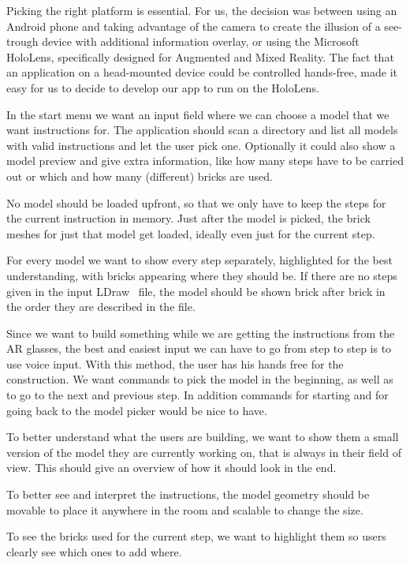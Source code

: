 \begin{description}[align=left]
	
	\item[Platform] 
	Picking the right platform is essential. For us, the decision was between using an Android phone and taking advantage of the camera to create the illusion of a see-trough device with additional information overlay, or using the Microsoft HoloLens, specifically designed for Augmented and Mixed Reality. The fact that an application on a head-mounted device could be controlled hands-free, made it easy for us to decide to develop our app to run on the HoloLens.
	
	\item [Model picker] 
	In the start menu we want an input field where we can choose a model that we want instructions for. The application should scan a directory and list all models with valid instructions and let the user pick one. Optionally it could also show a model preview and give extra information, like how many steps have to be carried out or which and how many (different) bricks are used.
	
	\item [Dynamically Loading] 
	No model should be loaded upfront, so that we only have to keep the steps for the current instruction in memory. Just after the model is picked, the brick meshes for just that model get loaded, ideally even just for the current step.
	
	\item [Step by Step Instruction]
	For every model we want to show every step separately, highlighted for the best understanding, with bricks appearing where they should be. If there are no steps given in the input LDraw~\cite{ldraw} file, the model should be shown brick after brick in the order they are described in the file.
	
	\item [Voice Input]
	Since we want to build something while we are getting the instructions from the AR glasses, the best and easiest input we can have to go from step to step is to use voice input. With this method, the user has his hands free for the construction. We want commands to pick the model in the beginning, as well as to go to the next and previous step. In addition commands  for starting and for going back to the model picker would be nice to have.
	
	\item [Small model]
	To better understand what the users are building, we want to show them a small version of the model they are currently working on, that is always in their field of view. This should give an overview of how it should look in the end.
	
	\item[Movable/Scalable model] 
	To better see and interpret the instructions, the model geometry should be movable to place it anywhere in the room and scalable to change the size.
	
	\item[Step Highlighting]
	To see the bricks used for the current step, we want to highlight them so users clearly see which ones to add where.
		
\end{description}

